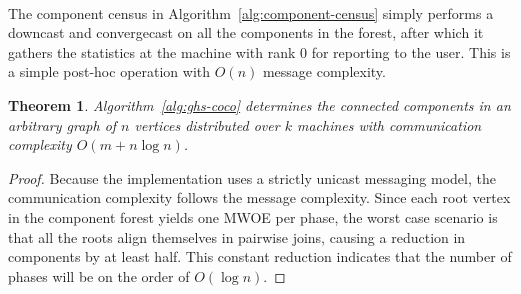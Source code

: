 \documentclass[11pt,epsf]{article}
\newtheorem{theorem}{Theorem}
\begin{document}
{{{\begin{algorithm}
\begin{algorithmic}
{            

            \ENDFOR
          }\ENDWHILE

          \ENDFOR
          \ENDFOR
        \end{algorithmic}
      \end{algorithm}
    }
    \paragraph{}{
      The component census in Algorithm~\ref{alg:component-census} simply performs a downcast and
      convergecast on all the components in the forest, after which it gathers the statistics
      at the machine with rank 0 for reporting to the user. This is a simple post-hoc operation
      with $O(n)$ message complexity.
    }

    \begin{theorem}
      \label{thm:ghs-coco}
      Algorithm~\ref{alg:ghs-coco} determines the connected components in an arbitrary graph
      of $n$ vertices distributed over $k$ machines with communication complexity $O(m + n \log n)$.
    \end{theorem}
    \begin{proof}
      Because the implementation uses a strictly unicast messaging model, the communication complexity
      follows the message complexity. Since each root vertex in the component forest yields
      one MWOE per phase, the worst case scenario is that all the roots align themselves
      in pairwise joins, causing a reduction in components by at least half. This constant reduction
      indicates that the number of phases will be on the order of $O(\log n)$.

\end{proof}}}
\end{document}
